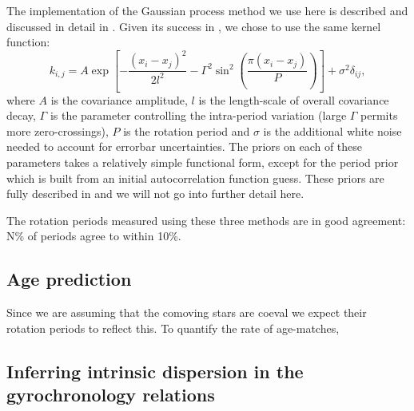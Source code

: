 
The implementation of the Gaussian process method we use here is described and
discussed in detail in \citet{Angus2017}.
Given its success in \citet{Angus2017}, we chose to use the same kernel
function:
\begin{equation}
\label{eq:QP}
k_{i,j} = A \exp \left[-\frac{(x_i - x_j)^2}{2l^2} -
    \Gamma^2 \sin^2\left(\frac{\pi(x_i - x_j)}{P}\right) \right] + \sigma^2
    \delta_{ij},
\end{equation}
where $A$ is the covariance amplitude, $l$ is the length-scale of overall
covariance decay, $\Gamma$ is the parameter controlling
the intra-period variation (large $\Gamma$ permits more zero-crossings), $P$
is the rotation period and $\sigma$ is the additional white noise needed to
account for errorbar uncertainties.
The priors on each of these parameters takes a relatively simple functional
form, except for the period prior which is built from an initial
autocorrelation function guess.
These priors are fully described in \cite{Angus2017} and we will not go into
further detail here.

The rotation periods measured using these three methods are in good agreement:
N\% of periods agree to within 10\%.

\subsection{Age prediction}

Since we are assuming that the comoving stars are coeval we expect their
rotation periods to reflect this.
To quantify the rate of age-matches,

\subsection{Inferring intrinsic dispersion in the gyrochronology
relations}
